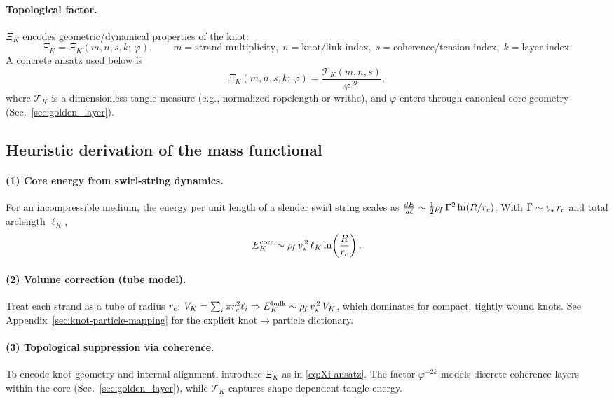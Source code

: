 \paragraph{Topological factor.}
\(\Xi_K\) encodes geometric/dynamical properties of the knot:
\[
	\Xi_K = \Xi_K(m,n,s,k;\,\varphi), \qquad
	m=\text{strand multiplicity},\; n=\text{knot/link index},\;
	s=\text{coherence/tension index},\;
	k=\text{layer index}.
\]
A concrete ansatz used below is
\begin{equation}
	\Xi_K(m,n,s,k;\,\varphi) = \frac{\mathcal{T}_K(m,n,s)}{\varphi^{\,2k}},
	\label{eq:Xi-ansatz}
\end{equation}
where \(\mathcal{T}_K\) is a dimensionless tangle measure (e.g., normalized ropelength or writhe), and \(\varphi\) enters through canonical core geometry (Sec.~\ref{sec:golden_layer}).

\subsection{Heuristic derivation of the mass functional}

\paragraph{(1) Core energy from swirl-string dynamics.}
For an incompressible medium, the energy per unit length of a slender swirl string scales as
\(
\tfrac{dE}{d\ell} \sim \tfrac{1}{2}\rho_{\!f}\,\Gamma^2 \ln (R/r_c)
\).
With \(\Gamma \sim v_\star\,r_c\) and total arclength \(\ell_K\),
\begin{equation}
	E_K^{\mathrm{core}} \sim \rho_{\!f}\,v_\star^{\,2}\,\ell_K \ln\!\left(\frac{R}{r_c}\right).
\end{equation}

\paragraph{(2) Volume correction (tube model).}
Treat each strand as a tube of radius \(r_c\):
\(
V_K=\sum_i \pi r_c^2 \ell_i
\Rightarrow
E_K^{\mathrm{bulk}} \sim \rho_{\!f}\,v_\star^{\,2}\,V_K
\),
which dominates for compact, tightly wound knots.
See Appendix~\ref{sec:knot-particle-mapping} for the explicit knot\(\to\)particle dictionary.

\paragraph{(3) Topological suppression via coherence.}
To encode knot geometry and internal alignment, introduce \(\Xi_K\) as in \eqref{eq:Xi-ansatz}. The factor \(\varphi^{-2k}\) models discrete coherence layers within the core (Sec.~\ref{sec:golden_layer}), while \(\mathcal{T}_K\) captures shape-dependent tangle energy.

